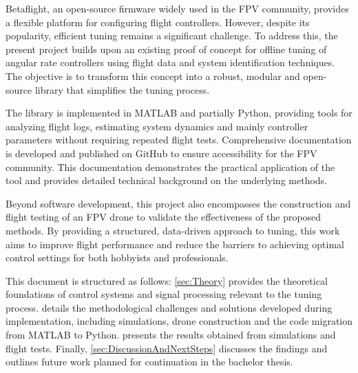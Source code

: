 \documentclass[a4paper,11pt]{scrartcl}
\begin{document}
Betaflight, an open-source firmware widely used in the FPV community, provides a flexible platform for configuring flight controllers. However, despite its popularity, efficient tuning remains a significant challenge. To address this, the present project builds upon an existing proof of concept for offline tuning of angular rate controllers using flight data and system identification techniques. The objective is to transform this concept into a robust, modular and open-source library that simplifies the tuning process.

The library is implemented in MATLAB and partially Python, providing tools for analyzing flight logs, estimating system dynamics and mainly controller parameters without requiring repeated flight tests. Comprehensive documentation is developed and published on GitHub to ensure accessibility for the FPV community. This documentation demonstrates the practical application of the tool and provides detailed technical background on the underlying methods.

Beyond software development, this project also encompasses the construction and flight testing of an FPV drone to validate the effectiveness of the proposed methods. By providing a structured, data-driven approach to tuning, this work aims to improve flight performance and reduce the barriers to achieving optimal control settings for both hobbyists and professionals.

This document is structured as follows: \autoref{sec:Theory} provides the theoretical foundations of control systems and signal processing relevant to the tuning process.  details the methodological challenges and solutions developed during implementation, including simulations, drone construction and the code migration from MATLAB to Python.  presents the results obtained from simulations and flight tests. Finally, \autoref{sec:DiscussionAndNextSteps} discusses the findings and outlines future work planned for continuation in the bachelor thesis.

\clearpage
\end{document}
